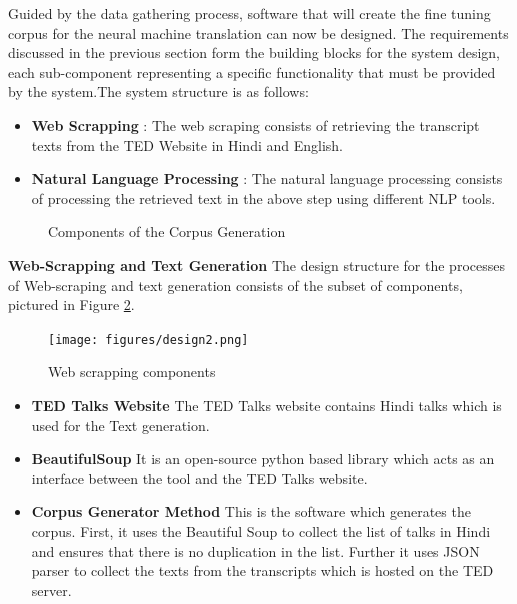 Guided by the data gathering process, software that will create the fine tuning corpus for the neural machine translation can now be designed. The requirements discussed in the previous section form the building blocks for the system design, each sub-component representing a specific functionality that must be provided by the system.The system structure is as follows:

\begin{itemize}
    \item \textbf{Web Scrapping} : The web scraping consists of retrieving the transcript texts from the TED Website in Hindi and English.
    \item \textbf{Natural Language Processing} : The natural language processing consists of processing the retrieved text in the above step using different NLP tools.
\end{itemize}

\begin{figure}[!h]
\caption{Components of the Corpus Generation} \label{design1}
\end{figure}

\textbf{Web-Scrapping and Text Generation}
The design structure for the processes of Web-scraping and text generation consists of the subset of components, pictured in Figure \ref{design2}.

\begin{figure}[h]
\texttt{[image: figures/design2.png]}
\caption{Web scrapping components} \label{design2}
\end{figure}

\begin{itemize}
    \item \textbf{TED Talks Website} The TED Talks website contains Hindi talks which is used for the Text generation.
    \item \textbf{BeautifulSoup} It is an open-source python based library which acts as an interface between the tool and the TED Talks website.
    \item \textbf{Corpus Generator Method} This is the software which generates the corpus. First, it uses the Beautiful Soup to collect the list of talks in Hindi and ensures that there is no duplication in the list. Further it uses JSON parser to collect the texts from the transcripts which is hosted on the TED server.
\end{itemize}

